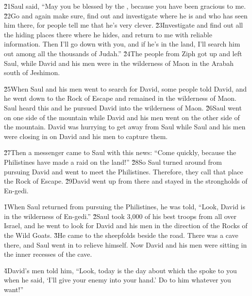 \v{21}Saul said, ``May you be blessed by the , because you have been gracious to me. \v{22}Go and again make sure, find out and investigate where he is and who has seen him there, for people tell me that he's very clever. \v{23}Investigate and find out all the hiding places there where he hides, and return to me with reliable information. Then I'll go down with you, and if he's in the land, I'll search him out among all the thousands of Judah.'' \v{24}The people from Ziph got up and left Saul, while David and his men were in the wilderness of Maon in the Arabah south of Jeshimon.

\v{25}When Saul and his men went to search for David, some people told David, and he went down to the Rock of Escape and remained in the wilderness of Maon. Saul heard this and he pursued David into the wilderness of Maon. \v{26}Saul went on one side of the mountain while David and his men went on the other side of the mountain. David was hurrying to get away from Saul while Saul and his men were closing in on David and his men to capture them.

\v{27}Then a messenger came to Saul with this news: ``Come quickly, because the Philistines have made a raid on the land!'' \v{28}So Saul turned around from pursuing David and went to meet the Philistines. Therefore, they call that place the Rock of Escape. \v{29}David went up from there and stayed in the strongholds of En-gedi.

\v{1}When Saul returned from pursuing the Philistines, he was told, ``Look, David is in the wilderness of En-gedi.'' \v{2}Saul took 3,000 of his best troops from all over Israel, and he went to look for David and his men in the direction of the Rocks of the Wild Goats. \v{3}He came to the sheepfolds beside the road. There was a cave there, and Saul went in to relieve himself. Now David and his men were sitting in the inner recesses of the cave.

\v{4}David's men told him, ``Look, today is the day about which the  spoke to you when he said, `I'll give your enemy into your hand.' Do to him whatever you want!''

